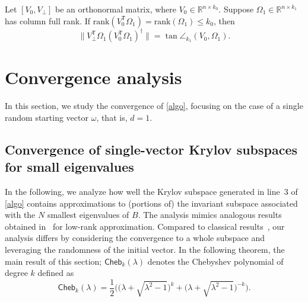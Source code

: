 \documentclass{siamart190516}
\newcommand{\Ttran}{\mathsf{T}}
\newcommand{\R}{\mathbb{R}}
\newcommand{\rk}{\mathrm{rank}}
\newcommand{\cheb}{\mathsf{Cheb}}
\providecommand{\norm}[1]{\lVert#1\rVert}
\begin{document}
\begin{proposition}
    \label{proptan} 
    Let $[V_{0},V_{\perp}]$ be an orthonormal matrix, where $V_{0}\in\R^{n\times k_{0}}$. Suppose $\Omega_{1}\in\R^{n\times k_{1}}$ has column full rank. If $\rk(V_{0}^{\Ttran}\Omega_{1})=\rk(\Omega_{1})\leq k_{0}$, then 
    \begin{equation*}    
    \norm{V_{\perp}^{\Ttran}\Omega_{1}(V_{0}^{\Ttran}\Omega_{1})^{\dagger}} = \tan\angle_{k_{1}}(V_{0},\Omega_{1}).
    \end{equation*}
\end{proposition}


\section{Convergence analysis}
\label{Sec:ConvAnal}

In this section, we study the convergence of \cref{algo}, focusing on the case of a single random starting vector $\omega$, that is, $d = 1$.

\subsection{Convergence of single-vector Krylov subspaces for small eigenvalues}

In the following, we analyze how well the Krylov subspace generated in line~3 of \cref{algo} contains approximations to (portions of) the invariant subspace associated with the $N$ smallest eigenvalues of $B$. The analysis mimics analogous results obtained in~\cite{Meyer2023} for low-rank approximation. Compared to classical results~\cite[Chapter VI]{Saad2011}, our analysis differs by considering the convergence to a whole subspace and leveraging the randomness of the initial vector. 
In the following theorem, the main result of this section; $\cheb_{k}(\lambda)$ denotes the Chebyshev polynomial of degree $k$ defined as 
\begin{equation}
    \label{defCheb}
    \cheb_{k}(\lambda) = \frac{1}{2}\big(\big(\lambda+\sqrt{\lambda^{2}-1}\big)^{k}+\big(\lambda+\sqrt{\lambda^{2}-1}\big)^{-k}\big).
\end{equation}
\end{document}
